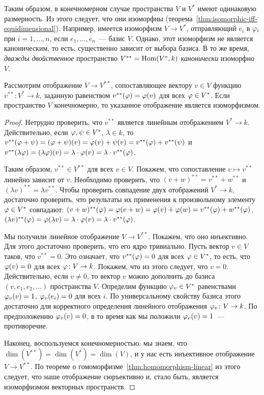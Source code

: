 Таким образом, в конечномерном случае пространства $V$ и $V^*$ имеют
одинаковую размерность. Из этого следует, что они изоморфны
(теорема~\ref{thm:isomorphic-iff-equidimensional}). Например, имеется
изоморфизм $V\to V^*$, отправляющий $e_i$ в $\varphi_i$ при $i=1,\dots,n$,
если $e_1,\dots,e_n$~--- базис $V$. Однако, этот изоморфизм не
является каноническим, то есть, существенно зависит от выбора базиса.
В то же время, {\it дважды двойственное} пространство
$V^{**} = \operatorname{Hom}(V^*,k)$ {\it канонически} изоморфно $V$.

\begin{proposition}
Рассмотрим отображение $V\to V^{**}$, сопоставляющее вектору $v\in V$
функцию $v^{**}\colon V^*\to k$, заданную равенством $v^{**}(\varphi) =
\varphi(v)$ для всех $\varphi\in V^*$. Если пространство $V$ конечномерно, то
указанное отображение является изоморфизмом.
\end{proposition}
\begin{proof}
Нетрудно проверить, что $v^{**}$ является линейным
отображением $V^*\to k$. Действительно, если $\varphi,\psi\in V^*$,
$\lambda\in k$, то
$v^{**}(\varphi+\psi) = (\varphi+\psi)(v) = \varphi(v) + \psi(v) = v^{**}(\varphi) +
v^{**}(\psi)$ и $v^{**}(\lambda\varphi) = (\lambda\varphi)(v) = \lambda\cdot\varphi(v)
= \lambda\cdot v^{**}(\varphi)$.

Таким образом, $v^{**}\in V^{**}$ для всех $v\in V$. Покажем, что
сопоставление $v\mapsto v^{**}$ линейно зависит от $v$. Необходимо
проверить, что $(v+w)^{**} = v^{**} + w^{**}$ и $(\lambda v)^{**} =
\lambda v^{**}$. Чтобы проверить совпадение двух отображений $V^*\to
k$, достаточно проверить, что результаты их применения к произвольному
элементу $\varphi\in V^*$ совпадают:
$(v+w)^{**}(\varphi) = \varphi(v+w) = \varphi(v)+\varphi(w) = v^{**}(\varphi) +
w^{**}(\varphi)$, $(\lambda v)^{**}(\varphi) = \varphi(\lambda v) =
\lambda\cdot\varphi(v) = \lambda\cdot v^{**}(\varphi)$.

Мы получили линейное отображение $V\to V^{**}$. Покажем, что оно
инъективно. Для этого достаточно проверить, что его ядро
тривиально. Пусть вектор $v\in V$ таков, что $v^{**}=0$. Это означает,
что $v^{**}(\varphi) = 0$ для всех $\varphi\in V^*$, то есть, что $\varphi(v)=0$
для всех $\varphi\colon V\to k$. Покажем, что из этого следует, что
$v=0$. Действительно, если $v\neq 0$, то вектор $v$ можно дополнить до
базиса $(v,e_1,e_2,\dots)$ пространства $V$. Определим функцию
$\varphi_v\in V^*$ равенствами $\varphi_v(v)=1$, $\varphi_v(e_i)=0$ для всех
$i$. По универсальному свойству базиса этого достаточно для
корректного определения линейного отображения $\varphi_v\colon V\to k$. По
предположению $\varphi_v(v) = 0$, в то время как мы положили
$\varphi_v(v) = 1$~--- противоречие.

Наконец, воспользуемся конечномерностью: мы знаем, что $\dim(V^{**}) =
\dim(V^*) = \dim(V)$, и у нас есть инъективное отображение $V\to
V^{**}$. По теореме о гомоморфизме~\ref{thm:homomorphism-linear}
из этого следует, что наше отображение сюръективно
и, стало быть, является изоморфизмом векторных пространств.
\end{proof}

